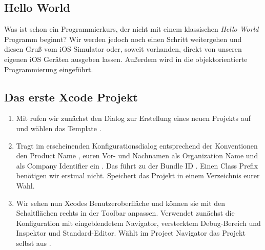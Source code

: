 \documentclass[parskip=half, final]{scrreprt}
\begin{document}
\begin{lecture} %


\chapter{Hello World}

Was ist schon ein Programmierkurs, der nicht mit einem klassischen \emph{Hello World} Programm beginnt? Wir werden jedoch noch einen Schritt weitergehen und diesen Gruß vom iOS Simulator oder, soweit vorhanden, direkt von unseren eigenen iOS Geräten ausgeben lassen. Außerdem wird in die objektorientierte Programmierung eingeführt.



\section{Das erste Xcode Projekt}

\begin{enumerate}

\item Mit  rufen wir zunächst den Dialog zur Erstellung eines neuen Projekts auf und wählen das Template .

\item Tragt im erscheinenden Konfigurationsdialog entsprechend der Konventionen den Product Name , euren Vor- und Nachnamen als Organization Name und  als Company Identifier ein . Das führt zu der Bundle ID . Einen Class Prefix benötigen wir erstmal nicht. Speichert das Projekt in einem Verzeichnis eurer Wahl.


\item Wir sehen nun Xcodes Benutzeroberfläche und können sie mit den Schaltflächen rechts in der Toolbar anpassen. Verwendet zunächst die Konfiguration mit eingeblendetem Navigator, verstecktem Debug-Bereich und Inspektor und Standard-Editor. Wählt im Project Navigator das Projekt selbst aus .



\end{enumerate}
\end{lecture}
\end{document}
